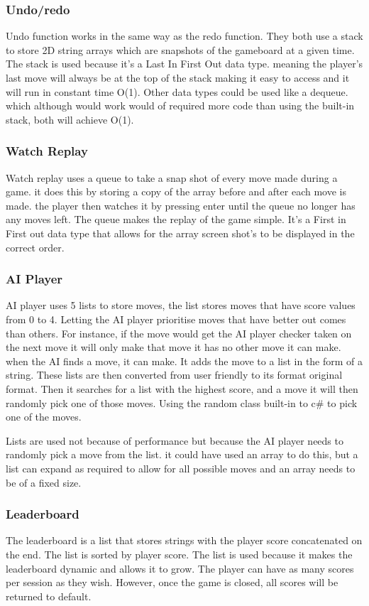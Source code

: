 \documentclass[10pt, a4paper]{article}
\begin{document}
	\subsubsection{Undo/redo}
	Undo function works in the same way as the redo function. They both use a stack to store 2D string arrays which are snapshots of the gameboard at a given time. The stack is used because it's a Last In First Out data type. meaning the player's last move will always be at the top of the stack making it easy to access and it will run in constant time O(1). Other data types could be used like a dequeue. which although would work would of required more code than using the built-in stack, both will achieve O(1).\cite{bigocheatsheet}
	\subsubsection{Watch Replay}
Watch replay uses a queue to take a snap shot of every move made during a game. it does this by storing a copy of the array before and after each move is made. the player then watches it by pressing enter until the queue no longer has any moves left. The queue makes the replay of the game simple. It's a First in First out data type that allows for the array screen shot's to be displayed in the correct order.\cite{Queue}
	\subsubsection{AI Player}
	AI player uses 5 lists to store moves, the list stores moves that have score values from 0 to 4. Letting the AI player prioritise moves that have better out comes than others. For instance, if the move would get the AI player checker taken on the next move it will only make that move it has no other move it can make. when the AI finds a move, it can make. It adds the move to a list in the form of a string. These lists are then converted from user friendly to its format original format. Then it searches for a list with the highest score, and a move it will then randomly pick one of those moves. Using the random class built-in to c\# to pick one of the moves.\cite{lists}

Lists are used not because of performance but because the AI player needs to randomly pick a move from the list. it could have used an array to do this, but a list can expand as required to allow for all possible moves and an array needs to be of a fixed size.

\subsubsection{Leaderboard}
	The leaderboard is a list that stores strings with the player score concatenated on the end. The list is sorted by player score. The list is used because it makes the leaderboard dynamic and allows it to grow. The player can have as many scores per session as they wish. However, once the game is closed, all scores will be returned to default.
\end{document}
